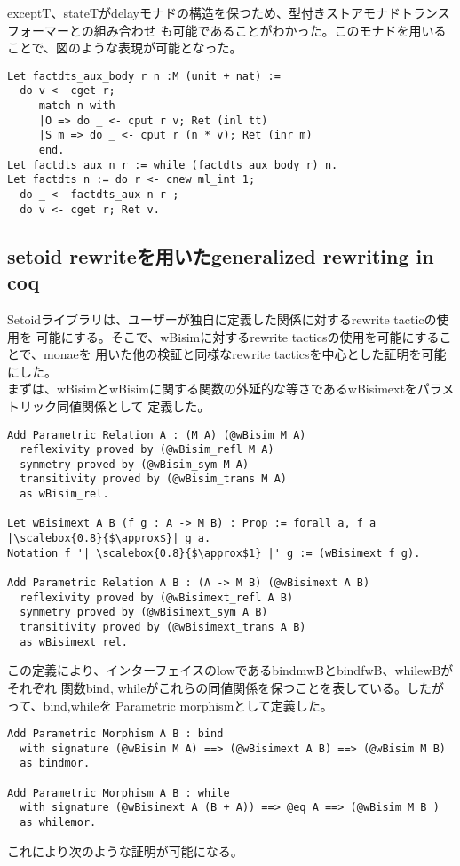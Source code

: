 \documentclass[japanese]{jssst_ppl}
\theoremstyle{definition}
\begin{document}
exceptT、stateTがdelayモナドの構造を保つため、型付きストアモナドトランスフォーマーとの組み合わせ
も可能であることがわかった。このモナドを用いることで、図のような表現が可能となった。

\begin{verbatim}
Let factdts_aux_body r n :M (unit + nat) :=
  do v <- cget r;
     match n with
     |O => do _ <- cput r v; Ret (inl tt)
     |S m => do _ <- cput r (n * v); Ret (inr m)
     end.
Let factdts_aux n r := while (factdts_aux_body r) n.
Let factdts n := do r <- cnew ml_int 1;
  do _ <- factdts_aux n r ;
  do v <- cget r; Ret v.
            \end{verbatim}
\subsection{setoid rewriteを用いたgeneralized rewriting in coq}
Setoidライブラリは、ユーザーが独自に定義した関係に対するrewrite tacticの使用を
可能にする。そこで、wBisimに対するrewrite tacticsの使用を可能にすることで、monaeを
用いた他の検証と同様なrewrite tacticsを中心とした証明を可能にした。\\

まずは、wBisimとwBisimに関する関数の外延的な等さであるwBisimextをパラメトリック同値関係として
定義した。
\begin{verbatim}
Add Parametric Relation A : (M A) (@wBisim M A)
  reflexivity proved by (@wBisim_refl M A)
  symmetry proved by (@wBisim_sym M A)
  transitivity proved by (@wBisim_trans M A)
  as wBisim_rel.

Let wBisimext A B (f g : A -> M B) : Prop := forall a, f a |\scalebox{0.8}{$\approx$}| g a.
Notation f '| \scalebox{0.8}{$\approx$1} |' g := (wBisimext f g).

Add Parametric Relation A B : (A -> M B) (@wBisimext A B)
  reflexivity proved by (@wBisimext_refl A B)
  symmetry proved by (@wBisimext_sym A B)
  transitivity proved by (@wBisimext_trans A B)
  as wBisimext_rel.
        \end{verbatim}
この定義により、インターフェイスのlowであるbindmwBとbindfwB、whilewBがそれぞれ
関数bind, whileがこれらの同値関係を保つことを表している。したがって、bind,whileを
Parametric morphismとして定義した。
\begin{verbatim}
Add Parametric Morphism A B : bind
  with signature (@wBisim M A) ==> (@wBisimext A B) ==> (@wBisim M B)
  as bindmor.

Add Parametric Morphism A B : while
  with signature (@wBisimext A (B + A)) ==> @eq A ==> (@wBisim M B )
  as whilemor.
        \end{verbatim}
これにより次のような証明が可能になる。
\end{document}
